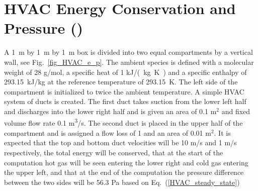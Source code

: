 \documentclass[11pt]{book}
\begin{document}
\clearpage

\section{HVAC Energy Conservation and Pressure (\texorpdfstring{}{HVAC\_energy\_pressure})}
\label{HVAC_energy_pressure}

A 1~m by 1~m by 1~m box is divided into two equal compartments by a vertical wall, see Fig.~\ref{fig_HVAC_e_p}.
The ambient species is defined with a molecular weight of 28 g/mol, a specific heat of 1 \si{kJ/(kg.K)} and a specific enthalpy of 293.15~kJ/kg at the reference temperature of 293.15~K.
The left side of the compartment is initialized to twice the ambient temperature.  A simple HVAC system of ducts is created.
The first duct takes suction from the lower left half and discharges into the lower right half and is given an area of 0.1 m$^2$ and fixed volume flow rate 0.1 \si{m^3/s}.
The second duct is placed in the upper half of the compartment and is assigned a flow loss of 1 and an area of 0.01 m$^2$.  It is expected that the top and bottom duct velocities will be 10 m/s and 1 m/s respectively, the total energy will be conserved, that at the start of the computation hot gas will be seen entering the lower right and cold gas entering the upper left, and that at the end of the computation the pressure difference between the two sides will be 56.3 Pa based on Eq.~(\ref{HVAC_steady_state})
\end{document}
